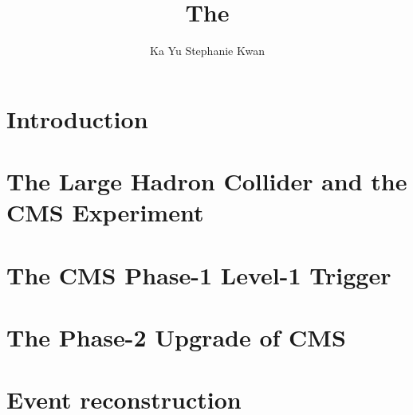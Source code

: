 \documentclass[12pt,lot,lof]{puthesis}
\title{The}
\author{Ka Yu Stephanie Kwan}
\begin{document}
\chapter{Introduction}


\chapter{The Large Hadron Collider and the CMS Experiment}


\chapter{The CMS Phase-1 Level-1 Trigger}


\chapter{The Phase-2 Upgrade of CMS}


\chapter{Event reconstruction}



% 


 \label{bib}
\end{document}
